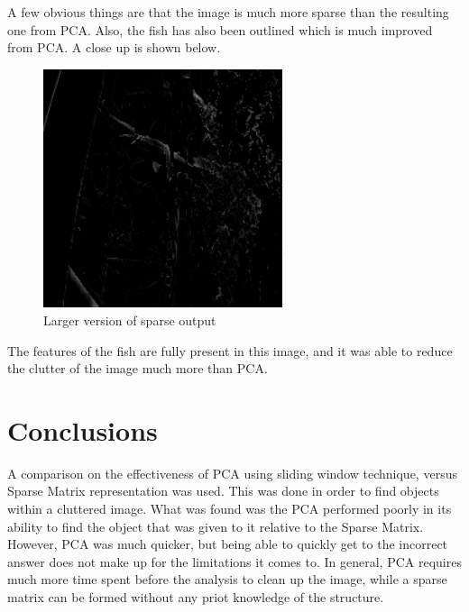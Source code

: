 \documentclass[11pt]{article} %
\begin{document}
A few obvious things are that the image is much more sparse than the resulting one from PCA. Also, the fish
has also been outlined which is much improved from PCA. A close up is shown below.
\begin{figure}[H]
\includegraphics[width=7cm]{Images/sprs2.png}
\caption{Larger version of sparse output}
\end{figure}
The features of the fish are fully present in this image, and it was able to reduce the clutter of the image much
more than PCA.

\section{Conclusions}
A comparison on the effectiveness of PCA using sliding window technique, versus Sparse Matrix representation was used.
This was done in order to find objects within a cluttered image. What was found was the PCA performed poorly in its ability to find
the object that was given to it relative to the Sparse Matrix. However, PCA was much quicker, but being able to quickly get to the
incorrect answer does not make up for the limitations it comes to. In general, PCA requires much more time spent before the analysis to
clean up the image, while a sparse matrix can be formed without any priot knowledge of the structure.
\end{document}

